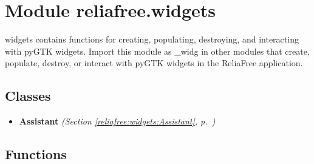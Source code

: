 %
%
%


\section{Module reliafree.widgets}

    \label{reliafree:widgets}
widgets contains functions for creating, populating, destroying, and 
interacting with pyGTK widgets.  Import this module as \_widg in other 
modules that create, populate, destroy, or interact with pyGTK widgets in 
the ReliaFree application.



\subsection{Classes}

\begin{itemize}  \setlength{\parskip}{0ex}
  \item \textbf{Assistant}
  \textit{(Section \ref{reliafree:widgets:Assistant}, p.~\pageref{reliafree:widgets:Assistant})}

\end{itemize}


  \subsection{Functions}

    \label{reliafree:widgets:make_button}

